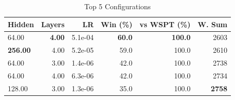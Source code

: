 \begin{table}[htbp]%
\centering%
\begin{tabular}{lrrrrr}%
\toprule%
\textbf{Hidden}&\textbf{Layers}&\textbf{LR}&\textbf{Win (\%)}&\textbf{vs WSPT (\%)}&\textbf{W. Sum}\\%
\midrule%
64.00&\textbf{4.00}&5.1e-04&\textbf{60.0}&\textbf{100.0}&2603\\%
\textbf{256.00}&4.00&5.2e-05&59.0&100.0&2610\\%
64.00&3.00&1.4e-06&42.0&100.0&2738\\%
64.00&4.00&6.3e-06&42.0&100.0&2734\\%
128.00&3.00&1.3e-06&35.0&100.0&\textbf{2758}\\%
\bottomrule%
\end{tabular}%
\caption{Top 5 Configurations}%
\label{tab:summary}%
\end{table}
